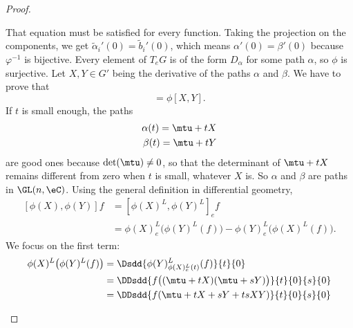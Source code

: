 \begin{proof}
\begin{subproof}
\begin{equation}
		\end{equation}
		That equation must be satisfied for every function. Taking the projection on the components, we get \( \tilde \alpha_i'(0)=\tilde b_i'(0)\), which means \( \alpha'(0)=\beta'(0)\) because \( \varphi^{-1}\) is bijective.
		Every element of \( T_eG\) is of the form \( D_{\alpha}\) for some path \( \alpha\), so \( \phi\) is surjective.
		Let \( X,Y\in G'\) being the derivative of the paths \( \alpha\) and \( \beta\). We have to prove that
		\begin{equation}
			[\phi(X),\phi(Y)]=\phi[X,Y].
		\end{equation}
		If \( t\) is small enough, the paths
		\begin{subequations}
			\begin{align}
				\alpha(t)=\mtu+tX \\
				\beta(t)=\mtu+tY  \\
			\end{align}
		\end{subequations}
		are good ones because \( \det(\mtu)\neq 0\), so that the determinant of \( \mtu+tX\) remains different from zero when \( t\) is small, whatever \( X\) is. So \( \alpha\) and \( \beta\) are paths in \( \GL(n,\eC)\). Using the general definition in differential geometry,
		\begin{subequations}        \label{SUBEQSooCYRDooFOdLrn}
			\begin{align}
				[\phi(X),\phi(Y)]f & =[\phi(X)^L,\phi(Y)^L]_ef                                                                             \\
				                   & =\phi(X)^L_e\big( \phi(Y)^L(f) \big)-\phi(Y)^L_e\big( \phi(X)^L(f) \big) \label{SUBEQooOPUAooZYsZlX}.
			\end{align}
		\end{subequations}
		We focus on the first term:
		\begin{subequations}        \label{SUBEQooTUNFooFkDmuP}
			\begin{align}
				\phi(X)^L\big( \phi(Y)^L(f) \big) & =\Dsdd{ \phi(Y)^L_{\phi(X)^L_e(t)}(f) }{t}{0}                                                  \\
				                                  & =\DDsdd{ f\big( (\mtu+tX)(\mtu+sY) \big) }{t}{0}{s}{0}                                         \\
				                                  & =\DDsdd{ f(\mtu+tX+sY+tsXY) }{t}{0}{s}{0}                                                      \\

\end{align}
\end{subequations}
\end{subproof}
\end{proof}
